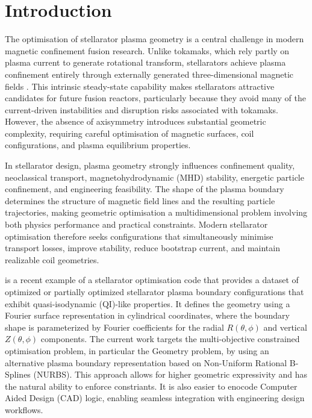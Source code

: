 \documentclass{article}
\begin{document}
\section{Introduction}
The optimisation of stellarator plasma geometry is a 
central challenge in modern magnetic confinement 
fusion research. Unlike tokamaks, which rely partly on 
plasma current to generate rotational transform, 
stellarators achieve plasma confinement entirely 
through externally generated three-dimensional 
magnetic fields \cite{Velasco2024PiecewiseOmnigenousStellarators}. 
This intrinsic steady-state capability 
makes stellarators attractive candidates for future fusion 
reactors, particularly because they avoid many of the 
current-driven instabilities\cite{Bin2022RunawayElectronDrivenInstabilities}
\cite{CriticalRoleCurrentDrivenInstabilitiesELMsNSTX}
\cite{Duperrex1991GlobalSawtoothJET}
\cite{JardinSawtoothTokamaks}
\cite{MHDLimitsTokamakOperation}
\cite{RunawayElectronAlfvenicInstabilitiesDIII-D}
\cite{MagneticControlMHDInstabilitiesTokamaks}
 and disruption risks 
 \cite{ITERDisruptionMitigation2024}
 \cite{Cecconello2024ControlOrientedDisruptionPrediction}
 \cite{Bernardini2012TheoryTokamakDisruptions}
\cite{Kleiner2022CriticalRoleCurrentDrivenELMsNSTX}
\cite{DisruptionMitigationMassiveMaterialInjection2025}
\cite{ComprehensiveDisruptionMitigation2025}
\cite{AIHelpsPreventDisruptions2021}
associated with tokamaks. However, the absence of axisymmetry 
introduces substantial geometric complexity, requiring 
careful optimisation of magnetic surfaces, coil configurations, 
and plasma equilibrium properties.

In stellarator design, plasma geometry strongly influences confinement quality, 
neoclassical transport, magnetohydrodynamic (MHD) stability, 
energetic particle confinement, and engineering feasibility. 
The shape of the plasma boundary determines the structure of magnetic 
field lines and the resulting particle trajectories, making geometric 
optimisation a multidimensional problem involving both physics performance 
and practical constraints. Modern stellarator optimisation therefore 
seeks configurations that simultaneously minimise transport losses, 
improve stability, reduce bootstrap current, and maintain realizable 
coil geometries.

\cite{Cadena2025ConStellaration} is a recent example of a stellarator optimisation 
code that provides a dataset of optimized or partially 
optimized stellarator plasma boundary configurations 
that exhibit quasi-isodynamic (QI)-like properties. It defines the geometry 
using a Fourier surface representation in cylindrical coordinates, 
where the boundary shape is parameterized by Fourier coefficients 
for the radial $R(\theta,\phi)$ and vertical $Z(\theta,\phi)$ components.
The current work targets the multi-objective constrained optimisation
problem, in particular the Geometry problem, by using an alternative
plasma boundary representation based on Non-Uniform Rational B-Splines (NURBS).
This approach allows for higher geometric expressivity and 
has the natural ability to enforce constriants. It is also
easier to enocode Computer Aided Design (CAD) logic, 
enabling seamless integration with engineering design workflows.
\end{document}
